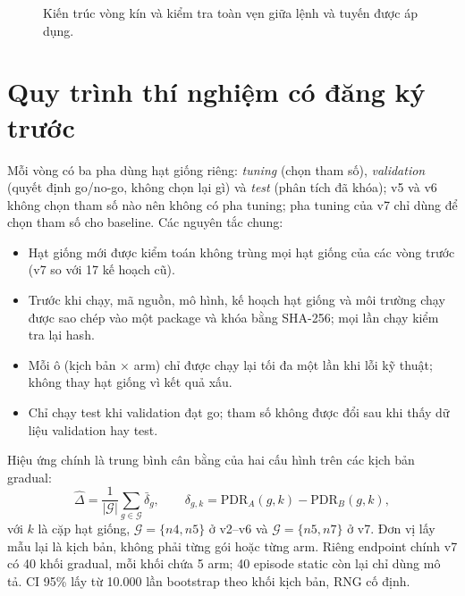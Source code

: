 \documentclass[12pt,a4paper]{report}
\newcommand{\code}[1]{\texttt{\detokenize{#1}}}
\begin{document}
\begin{figure}[H]
\centering
{}
\caption{Kiến trúc vòng kín và kiểm tra toàn vẹn giữa lệnh và tuyến được áp dụng.}\label{fig:arch}
\end{figure}

\section{Quy trình thí nghiệm có đăng ký trước}
Mỗi vòng có ba pha dùng hạt giống riêng: \emph{tuning} (chọn tham số), \emph{validation} (quyết định go/no-go, không chọn lại gì) và \emph{test} (phân tích đã khóa); v5 và v6 không chọn tham số nào nên không có pha tuning; pha tuning của v7 chỉ dùng để chọn tham số cho baseline. Các nguyên tắc chung:
\begin{itemize}
  \item Hạt giống mới được kiểm toán không trùng mọi hạt giống của các vòng trước (v7 so với 17 kế hoạch cũ).
  \item Trước khi chạy, mã nguồn, mô hình, kế hoạch hạt giống và môi trường chạy được sao chép vào một package và khóa bằng SHA-256; mọi lần chạy kiểm tra lại hash.
  \item Mỗi ô (kịch bản $\times$ arm) chỉ được chạy lại tối đa một lần khi lỗi kỹ thuật; không thay hạt giống vì kết quả xấu.
  \item Chỉ chạy test khi validation đạt go; tham số không được đổi sau khi thấy dữ liệu validation hay test.
\end{itemize}
Hiệu ứng chính là trung bình cân bằng của hai cấu hình trên các kịch bản gradual:
\begin{equation}
\hat\Delta=\frac{1}{|\mathcal G|}\sum_{g\in\mathcal G}\bar\delta_g,\qquad \delta_{g,k}=\mathrm{PDR}_{A}(g,k)-\mathrm{PDR}_{B}(g,k),
\end{equation}
với $k$ là cặp hạt giống, $\mathcal G=\{n4,n5\}$ ở v2--v6 và $\mathcal G=\{n5,n7\}$ ở v7. Đơn vị lấy mẫu lại là kịch bản, không phải từng gói hoặc từng arm. Riêng endpoint chính v7 có 40 khối gradual, mỗi khối chứa 5 arm; 40 episode static còn lại chỉ dùng mô tả. CI 95\% lấy từ 10.000 lần bootstrap theo khối kịch bản, RNG cố định.
\end{document}
